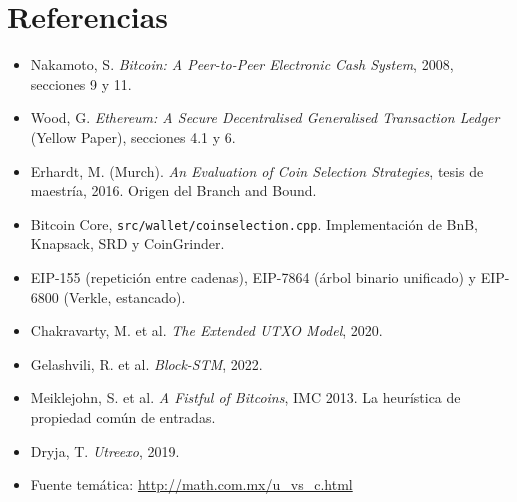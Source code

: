 \documentclass[11pt,a4paper]{article}
\theoremstyle{definition}
\theoremstyle{plain}
\theoremstyle{remark}
\begin{document}
\section{Referencias}

\begin{itemize}[leftmargin=1.4em]
  \item Nakamoto, S. \emph{Bitcoin: A Peer-to-Peer Electronic Cash System}, 2008,
        secciones 9 y 11.
  \item Wood, G. \emph{Ethereum: A Secure Decentralised Generalised Transaction
        Ledger} (Yellow Paper), secciones 4.1 y 6.
  \item Erhardt, M. (Murch). \emph{An Evaluation of Coin Selection Strategies},
        tesis de maestría, 2016. Origen del Branch and Bound.
  \item Bitcoin Core, \texttt{src/wallet/coinselection.cpp}. Implementación de
        BnB, Knapsack, SRD y CoinGrinder.
  \item EIP-155 (repetición entre cadenas), EIP-7864 (árbol binario unificado) y
        EIP-6800 (Verkle, estancado).
  \item Chakravarty, M. et al. \emph{The Extended UTXO Model}, 2020.
  \item Gelashvili, R. et al. \emph{Block-STM}, 2022.
  \item Meiklejohn, S. et al. \emph{A Fistful of Bitcoins}, IMC 2013. La
        heurística de propiedad común de entradas.
  \item Dryja, T. \emph{Utreexo}, 2019.
  \item Fuente temática: \url{http://math.com.mx/u_vs_c.html}
\end{itemize}
\end{document}
